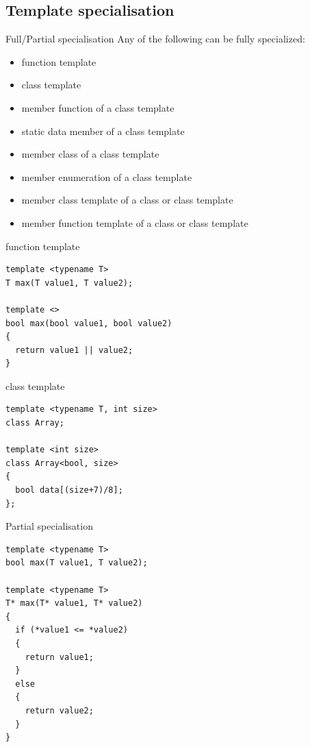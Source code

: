 \documentclass{beamer}
\begin{document}
\subsection{Template specialisation}
\begin{frame}{Full/Partial specialisation}
Any of the following can be fully specialized:
\begin{itemize}
  \item function template
  \item class template 
  \item member function of a class template
  \item static data member of a class template
  \item member class of a class template
  \item member enumeration of a class template
  \item member class template of a class or class template
  \item member function template of a class or class template
\end{itemize}
\end{frame}

\begin{frame}[fragile]{function template}
\begin{lstlisting}
template <typename T>
T max(T value1, T value2);

template <>
bool max(bool value1, bool value2)
{
  return value1 || value2; 
}
\end{lstlisting}
\end{frame}

\begin{frame}[fragile]{class template}
\begin{lstlisting}
template <typename T, int size>
class Array;

template <int size>
class Array<bool, size>
{
  bool data[(size+7)/8];
};
\end{lstlisting}
\end{frame}

\begin{frame}[fragile]{Partial specialisation}
\begin{lstlisting}
template <typename T>
bool max(T value1, T value2);

template <typename T>
T* max(T* value1, T* value2)
{
  if (*value1 <= *value2)
  {
    return value1;
  } 
  else
  {
    return value2;
  }
}

\end{lstlisting}
\end{frame}
\end{document}
